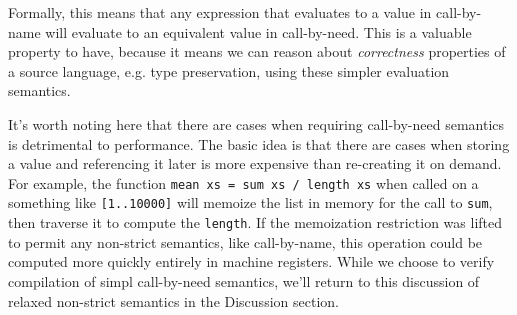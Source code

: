 Formally, this means that any expression that evaluates to a value in
call-by-name will evaluate to an equivalent value in call-by-need. This is a
valuable property to have, because it means we can reason about
\emph{correctness} properties of a source language, e.g. type preservation,
using these simpler evaluation semantics. 

It's worth noting here that there are cases when requiring call-by-need
semantics is detrimental to performance. The basic idea is that there are cases
when storing a value and referencing it later is more expensive than re-creating
it on demand. For example, the function \texttt{mean xs = sum xs / length xs}
when called on a something like \texttt{[1..10000]} will memoize the list in
memory for the call to \texttt{sum}, then traverse it to compute the
\texttt{length}.  If the memoization restriction was lifted to permit any
non-strict semantics, like call-by-name, this operation could be computed more
quickly entirely in machine registers. While we choose to verify compilation of
simpl call-by-need semantics, we'll return to this discussion of relaxed
non-strict semantics in the Discussion section.

